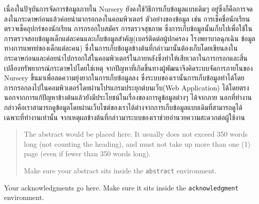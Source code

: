 \maketitle
\makesignature

\ifproject
\begin{abstractTH}
เนื่องในปัจุบันการจัดการข้อมูลภายใน Nursery ยังคงใช้วิธีการเก็บข้อมูลแบบเดิมๆ อยู่ซึ่งก็คือการจดลงในกระดาษก่อนแล้วค่อยนำมากรอกลงในคอมพิวเตอร์ ตัวอย่างของข้อมูล เช่น การเช็คชื่อนักเรียน ตรวจเช็คอุปกร์ของนักเรียน การกรอกใบสมัคร การตรวจสุขภาพ 
\enskip
ซึ่งการเก็บข้อมูลนั้นเก็บไปเพื่อใช้ในการตรวจสอบข้อมูลเด็กแต่ละคนและเก็บข้อมูลสำคัญ(เบอร์ติดต่อผู้ปกครอง โรงพยาบาลฉุกเฉิน ข้อมูลทางการแพทย์ของเด็กแต่ละคน)
\enskip
ซึ่งในการเก็บข้อมูลข้างต้นที่กล่าวมานั้นต้องเก็บโดยเขียนลงในกระดาษก่อนและค่อยนำไปกรอกใส่ในคอมพิวเตอร์ในภายหลังซึ่งทำให้เสียเวลาในการกรอกและสิ้นเปลืองทรัพยากรณ์กระดาษไปโดยใช่เหตุ 
\enskip 
จากปัญหาที่เกิดขึ้นทางผู้พัฒนาจึงคิดระบบจัดการภายในของ Nursery ขึ้นมาเพื่อลดความยุ่งยากในการเก็บข้อมูลลง ซึ่งระบบของเรานั้นการเก็บข้อมูลทำได้โดยการกรอกลงไปในคอมพิวเตอร์โดยผ่านโปรแกรมประยุกต์บนเว็บ(Web Application) ได้โดยตรง
\enskip
นอกจากการแก้ปัญหาข้างต้นแล้วยังมีประโยชน์ในเรื่องของการดูข้อมูลต่างๆ ได้จากภาย นอกที่ทำงาน กล่าวคือเราสามารถดูข้อมูลโดยผ่านเว็บไซต์ของเราได้ต่างจากการเก็บข้อมูลแบบเดิมที่สามารถดูได้เฉพาะที่ทำงานเท่านั้น จากเหตุผลข้างต้นที่กล่าวมาระบบของเราช่วยอำนวยความสะดวกต่อผู้ใช้งาน


\end{abstractTH}

\begin{abstract}
The abstract would be placed here. It usually does not exceed 350 words
long (not counting the heading), and must not take up more than one (1) page
(even if fewer than 350 words long).

Make sure your abstract sits inside the \texttt{abstract} environment.
\end{abstract}

\iffalse
\begin{dedication}
This document is dedicated to all Chiang Mai University students.

Dedication page is optional.
\end{dedication}
\fi %

\begin{acknowledgments}
Your acknowledgments go here. Make sure it sits inside the
\texttt{acknowledgment} environment.

\end{acknowledgments}%
\fi %

\contentspage

\ifproject
\figurelistpage

\tablelistpage
\fi %



